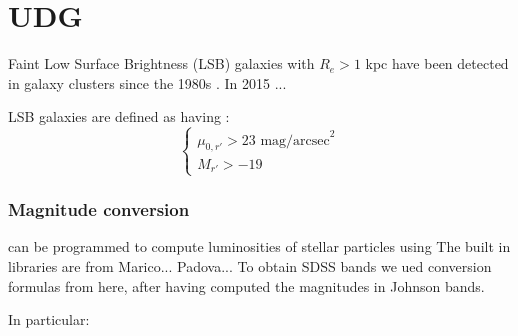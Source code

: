 \chapter{UDG}
Faint Low Surface Brightness (LSB) galaxies with $R_e > 1$ kpc have been detected in galaxy clusters since the 1980s \citep[e.g.]{Sandage1984}.
In 2015 \citet{VanDokkum2015}... %

LSB galaxies are defined as having \citep{Venhola2017}:
\begin{equation}
\begin{cases}
 \mu_{0,r'} > 23 \mbox{ mag/arcsec}^2\\

 M_{r'} > -19
\end{cases}
\end{equation}



\subsection{Magnitude conversion}
\pynbody{} can be programmed to compute luminosities of stellar particles using 
The built in libraries are from Marico... Padova... %
To obtain SDSS bands we ued conversion formulas from here, after having computed the magnitudes in Johnson bands.

In particular:

